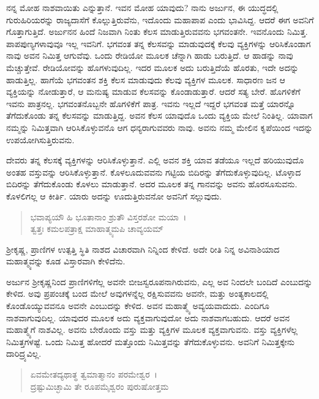 ನನ್ನ ಮೋಹ ನಾಶವಾಯಿತು ಎನ್ನುತ್ತಾನೆ. ಇವನ ಮೋಹ ಯಾವುದು? ನಾನು ಅರ್ಜುನ, ಈ ಯುದ್ಧದಲ್ಲಿ ಗುರುಹಿರಿಯರನ್ನು ರಾಜ್ಯದಾಸೆಗೆ ಕೊಲ್ಲುತ್ತಿರುವೆನು, ಇದೊಂದು ಮಹಾಪಾಪ ಎಂದು ಭಾವಿಸಿದ್ದ. ಆದರೆ ಈಗ ಅವನಿಗೆ ಗೊತ್ತಾಗುತ್ತಿದೆ. ಅರ್ಜುನನ ಹಿಂದೆ ನಿಜವಾಗಿ ನಿಂತು ಕೆಲಸ ಮಾಡುತ್ತಿರುವವನು ಭಗವಂತನೇ. ಇವನೊಂದು ನಿಮಿತ್ತ. ಪಾಪಪುಣ್ಯಗಳಾವುವೂ ಇಲ್ಲ ಇವನಿಗೆ. ಭಗವಂತ ತನ್ನ ಕೆಲಸವನ್ನು ಮಾಡುವುದಕ್ಕೆ ಕೆಲವು ವ್ಯಕ್ತಿಗಳನ್ನು ಆರಿಸಿಕೊಂಡಾಗ ನಾವು ಅವನ ನಿಮಿತ್ತ ಆಗುವೆವು. ಒಂದು ರೇಡಿಯೋ ಮೂಲಕ ಚೆನ್ನಾಗಿ ಹಾಡು ಬರುತ್ತಿದೆ. ಆ ಹಾಡನ್ನು ನಾವು ಮೆಚ್ಚುತ್ತೇವೆ. ರೇಡಿಯೋವನ್ನು ಹೊಗಳುವುದಿಲ್ಲ. ಇದರ ಮೂಲಕ ಅದು ಬರುತ್ತಿದೆಯೆ ಹೊರತು, ಇದೇ ಅದನ್ನು ಹಾಡುತ್ತಿಲ್ಲ. ಹಾಗೆಯೆ ಭಗವಂತನ ಶಕ್ತಿ ಕೆಲಸ ಮಾಡುವುದು ಕೆಲವು ವ್ಯಕ್ತಿಗಳ ಮೂಲಕ. ಸಾಧಾರಣ ಜನ ಆ ವ್ಯಕ್ತಿಯನ್ನು ನೋಡುತ್ತಾರೆ, ಆ ಮನುಷ್ಯ ಮಾಡುವ ಕೆಲಸವನ್ನು ಕೊಂಡಾಡುತ್ತಾರೆ. ಆದರೆ ಸತ್ಯ ಬೇರೆ. ಹೊಗಳಿಕೆಗೆ ಇವನು ಪಾತ್ರನಲ್ಲ. ಭಗವಂತನೊಬ್ಬನೇ ಹೊಗಳಿಕೆಗೆ ಪಾತ್ರ. ಇವನು ಇಲ್ಲದೆ ಇದ್ದರೆ ಭಗವಂತ ಮತ್ತೆ ಯಾರನ್ನೊ ತೆಗೆದುಕೊಂಡು ತನ್ನ ಕೆಲಸವನ್ನು ಮಾಡುತ್ತಿದ್ದ. ಅವನ ಕೆಲಸ ಯಾವುದೊ ಒಂದು ವ್ಯಕ್ತಿಯ ಮೇಲೆ ನಿಂತಿಲ್ಲ. ಯಾವಾಗ ನಮ್ಮನ್ನು ನಿಮಿತ್ತವಾಗಿ ಆರಿಸಿಕೊಳ್ಳುವನೊ ಆಗ ಧನ್ಯರಾಗುವವರು ನಾವು. ಅವನು ನಮ್ಮ ಮೇಲಿನ ಕೃಪೆಯಿಂದ ಇದನ್ನು ಉಪಯೋಗಿಸುತ್ತಿರುವನು.

ದೇವರು ತನ್ನ ಕೆಲಸಕ್ಕೆ ವ್ಯಕ್ತಿಗಳನ್ನು ಆರಿಸಿಕೊಳ್ಳುತ್ತಾನೆ. ಎಲ್ಲಿ ಅವನ ಶಕ್ತಿ ಯಾವ ತಡೆಯೂ ಇಲ್ಲದೆ ಹರಿಯುವುದೊ ಅಂತಹ ವಸ್ತುವನ್ನು ಆರಿಸಿಕೊಳ್ಳುತ್ತಾನೆ. ಕೊಳಲೂದುವವನು ಗಟ್ಟಿಯ ಬಿದಿರನ್ನು ತೆಗೆದುಕೊಳ್ಳುವುದಿಲ್ಲ. ಟೊಳ್ಳಾದ ಬಿದಿರನ್ನು ತೆಗೆದುಕೊಂಡು ಕೊಳಲು ಮಾಡುತ್ತಾನೆ. ಅದರ ಮೂಲಕ ತನ್ನ ಗಾನವನ್ನು ಅವನು ಹೊರಸೂಸುವನು. ಕೊಳಲಿಗಲ್ಲ ಆ ಕೀರ್ತಿ. ಯಾರು ಅದನ್ನು ಊದುತ್ತಿರುವನೋ ಅವನಿಗೆ ಸಲ್ಲುವುದು.

\begin{verse}
ಭವಾಪ್ಯಯೌ ಹಿ ಭೂತಾನಾಂ ಶ್ರುತೌ ವಿಸ್ತರಶೋ ಮಯಾ~।\\ತ್ವತ್ತಃ ಕಮಲಪತ್ರಾಕ್ಷ ಮಾಹಾತ್ಮ್ಯಮಪಿ ಚಾವ್ಯಯಮ್ 
\end{verse}

{\small ಶ‍್ರೀಕೃಷ್ಣ, ಪ್ರಾಣಿಗಳ ಉತ್ಪತ್ತಿ ಸ್ಥಿತಿ ನಾಶದ ವಿಚಾರವಾಗಿ ನಿನ್ನಿಂದ ಕೇಳಿದೆ. ಅದೇ ರೀತಿ ನಿನ್ನ ಅವಿನಾಶಿಯಾದ ಮಹಾತ್ಮ್ಯವನ್ನು ಕೂಡ ವಿಸ್ತಾರವಾಗಿ ಕೇಳಿದೆನು.}

ಅರ್ಜುನ ಶ‍್ರೀಕೃಷ್ಣನಿಂದ ಪ್ರಾಣಿಗಳಿಗೆಲ್ಲ ಅವನೇ ಬೀಜಸ್ವರೂಪನಾಗಿರುವನು, ಎಲ್ಲ ಅವ ನಿಂದಲೇ ಬಂದಿದೆ ಎಂಬುದನ್ನು ಕೇಳಿದ. ಅವು ಪ್ರಪಂಚಕ್ಕೆ ಬಂದ ಮೇಲೆ ಅವುಗಳನ್ನೆಲ್ಲ ರಕ್ಷಿಸುವವನು ಅವನೇ, ಮತ್ತು ಅಂತ್ಯಕಾಲದಲ್ಲಿ ಕೊಂಡೊಯ್ಯುವವನೂ ಅವನೇ ಎಂಬುದನ್ನು ಕೇಳಿದ. ಅವನ ಮಹಾತ್ಮ್ಯೆ ಅವ್ಯಯವಾದುದು. ಎಂದಿಗೂ ನಾಶವಾಗುವುದಿಲ್ಲ. ಯಾವುದರ ಮೂಲಕ ಅದು ವ್ಯಕ್ತವಾಗುವುದೋ ಅದು ನಾಶವಾಗಬಹುದು. ಆದರೆ ಅವನ ಮಹಾತ್ಮ್ಯೆಗೆ ನಾಶವಿಲ್ಲ. ಅವನು ಬೇರೊಂದು ವಸ್ತು ಮತ್ತು ವ್ಯಕ್ತಿಗಳ ಮೂಲಕ ವ್ಯಕ್ತವಾಗುವನು. ವಸ್ತು ವ್ಯಕ್ತಿಗಳೆಲ್ಲ ನಿಮಿತ್ತಗಳಷ್ಟೆ. ಒಂದು ನಿಮಿತ್ತ ಹೋದರೆ ಮತ್ತೊಂದು ನಿಮಿತ್ತವನ್ನು ತೆಗೆದುಕೊಳ್ಳುವನು. ಅವನಿಗೆ ನಿಮಿತ್ತಕ್ಕೇನು ದಾರಿದ್ರ್ಯವಿಲ್ಲ.

\begin{verse}
ಏವಮೇತದ್ಯಥಾತ್ಥ ತ್ವಮಾತ್ಮಾನಂ ಪರಮೇಶ್ವರ~।\\ದ್ರಷ್ಟುಮಿಚ್ಛಾಮಿ ತೇ ರೂಪಮೈಶ್ವರಂ ಪುರುಷೋತ್ತಮ 
\end{verse}

